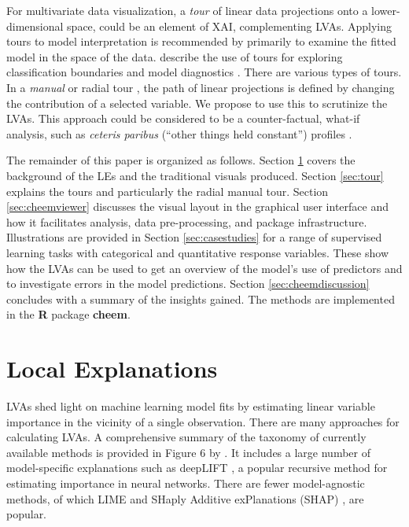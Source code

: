 \documentclass[
]{jss}
\begin{document}
For multivariate data visualization, a \emph{tour}
\citep{asimov_grand_1985, buja_grand_1986, lee_state_2021} of linear
data projections onto a lower-dimensional space, could be an element of
XAI, complementing LVAs. Applying tours to model interpretation is
recommended by \citet{wickham_visualizing_2015} primarily to examine the
fitted model in the space of the data. \citet{cook_interactive_2007}
describe the use of tours for exploring classification boundaries and
model diagnostics
\citep{Caragea2008, lee_pptree_2013, da_silva_projection_2021}. There
are various types of tours. In a \emph{manual} or radial tour
\citep{cook_manual_1997, spyrison_spinifex_2020}, the path of linear
projections is defined by changing the contribution of a selected
variable. We propose to use this to scrutinize the LVAs. This approach
could be considered to be a counter-factual, what-if analysis, such as
\emph{ceteris paribus} (``other things held constant'') profiles
\citep{biecek_ceterisparibus_2020}.

The remainder of this paper is organized as follows. Section
\ref{sec:explanations} covers the background of the LEs and the
traditional visuals produced. Section \ref{sec:tour} explains the tours
and particularly the radial manual tour. Section \ref{sec:cheemviewer}
discusses the visual layout in the graphical user interface and how it
facilitates analysis, data pre-processing, and package infrastructure.
Illustrations are provided in Section \ref{sec:casestudies} for a range
of supervised learning tasks with categorical and quantitative response
variables. These show how the LVAs can be used to get an overview of the
model's use of predictors and to investigate errors in the model
predictions. Section \ref{sec:cheemdiscussion} concludes with a summary
of the insights gained. The methods are implemented in the \textbf{R}
package \textbf{cheem}.

\hypertarget{sec:explanations}{%
\section{Local Explanations}\label{sec:explanations}}

LVAs shed light on machine learning model fits by estimating linear
variable importance in the vicinity of a single observation. There are
many approaches for calculating LVAs. A comprehensive summary of the
taxonomy of currently available methods is provided in Figure 6 by
\citet{arrieta_explainable_2020}. It includes a large number of
model-specific explanations such as deepLIFT
\citep{shrikumar_not_2016, shrikumar_learning_2017}, a popular recursive
method for estimating importance in neural networks. There are fewer
model-agnostic methods, of which LIME \citep{ribeiro_why_2016} and
SHaply Additive exPlanations (SHAP) \citep{lundberg_unified_2017}, are
popular.
\end{document}
